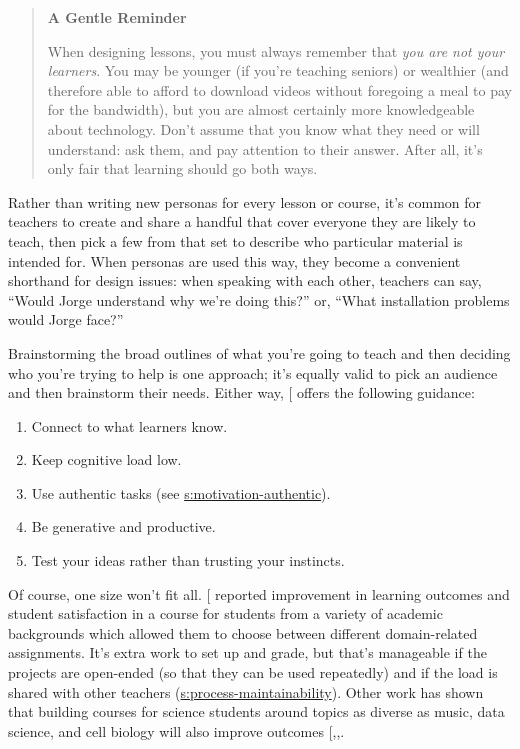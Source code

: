 \begin{quote}\setlength{\parindent}{0pt}
\textbf{A Gentle Reminder}

When designing lessons, you must always remember that \emph{you are not
your learners}. You may be younger (if you're teaching seniors) or
wealthier (and therefore able to afford to download videos without
foregoing a meal to pay for the bandwidth), but you are almost
certainly more knowledgeable about technology. Don't assume that you
know what they need or will understand: ask them, and pay attention
to their answer. After all, it's only fair that learning should go
both ways.
\end{quote}

Rather than writing new personas for every lesson or course, it's
common for teachers to create and share a handful that cover everyone
they are likely to teach, then pick a few from that set to describe
who particular material is intended for. When personas are used this
way, they become a convenient shorthand for design issues: when
speaking with each other, teachers can say, ``Would Jorge understand
why we're doing this?'' or, ``What installation problems would Jorge
face?''

Brainstorming the broad outlines of what you're going to teach and
then deciding who you're trying to help is one approach; it's equally
valid to pick an audience and then brainstorm their needs. Either way,
{[}\protect[\hyperlink{b:Guzd2016}{Guzd2016}]{]} offers the following guidance:

\begin{enumerate}
\item
  Connect to what learners know.
\item
  Keep cognitive load low.
\item
  Use authentic tasks (see \protect\hyperlink{SECTION}{s:motivation-authentic}).
\item
  Be generative and productive.
\item
  Test your ideas rather than trusting your instincts.
\end{enumerate}

Of course, one size won't fit all. {[}\protect[\hyperlink{b:Alha2018}{Alha2018}]{]} reported
improvement in learning outcomes and student satisfaction in a course
for students from a variety of academic backgrounds which allowed them
to choose between different domain-related assignments. It's extra
work to set up and grade, but that's manageable if the projects are
open-ended (so that they can be used repeatedly) and if the load is
shared with other teachers (\protect\hyperlink{SECTION}{s:process-maintainability}).
Other work has shown that building courses for science students around
topics as diverse as music, data science, and cell biology will also
improve outcomes
{[},,\protect[\hyperlink{b:Ritz2018}{Ritz2018}]{]}.

